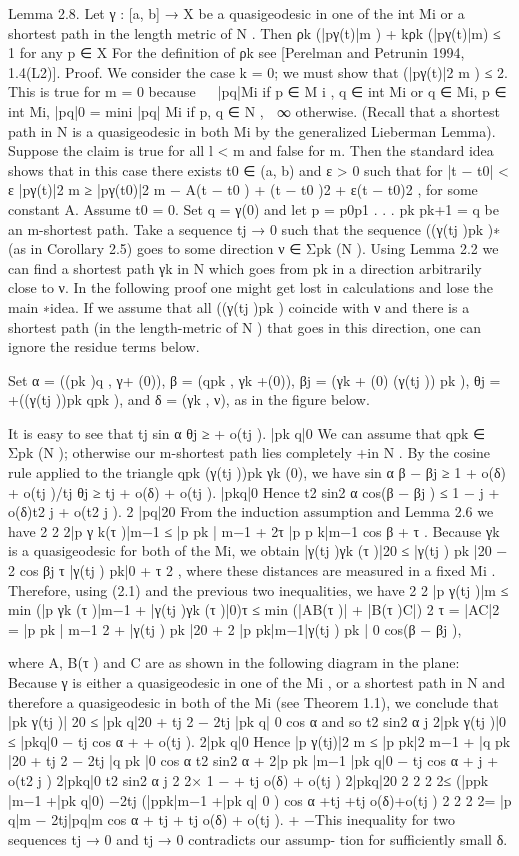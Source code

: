 Lemma 2.8. Let γ : [a, b] → X be a quasigeodesic in one of the int Mi or a
shortest path in the length metric of N . Then
ρk (|pγ(t)|m ) + kρk (|pγ(t)|m) ≤ 1
for any p ∈ X
For the definition of ρk see [Perelman and Petrunin 1994, 1.4(L2)].
Proof. We consider the case k = 0; we must show that (|pγ(t)|2 m ) ≤ 2.
This is true for m = 0 because

 |pq|Mi
 if p ∈ M i , q ∈ int Mi or q ∈ Mi, p ∈ int Mi,
|pq|0 = mini |pq| Mi if p, q ∈ N ,

∞
 otherwise.
(Recall that a shortest path in N is a quasigeodesic in both Mi by the generalized
Lieberman Lemma).
Suppose the claim is true for all l < m and false for m. Then the standard
idea shows that in this case there exists t0 ∈ (a, b) and ε > 0 such that for
|t − t0| < ε
|pγ(t)|2 m ≥ |pγ(t0)|2 m − A(t − t0 ) + (t − t0 )2 + ε(t − t0)2 ,
for some constant A.
Assume t0 = 0. Set q = γ(0) and let p = p0p1 . . . pk pk+1 = q be an m-shortest
path. Take a sequence tj → 0 such that the sequence ((γ(tj )pk )∗ (as in Corollary
2.5) goes to some direction ν ∈ Σpk (N ). Using Lemma 2.2 we can find a shortest
path γk in N which goes from pk in a direction arbitrarily close to ν.
In the following proof one might get lost in calculations and lose the main
∗idea. If we assume that all ((γ(tj )pk ) coincide with ν and there is a shortest
path (in the length-metric of N ) that goes in this direction, one can ignore the
residue terms below.

Set α = ((pk )q , γ+ (0)), β = (qpk , γk +(0)), βj = (γk + (0) (γ(tj )) pk ), θj =
+((γ(tj ))pk qpk ), and δ = (γk , ν), as in the figure below.

It is easy to see that
tj sin α
θj ≥
 + o(tj ).
|pk q|0
We can assume that qpk ∈ Σpk (N ); otherwise our m-shortest path lies completely
+in N . By the cosine rule applied to the triangle qpk (γ(tj ))pk γk (0), we have
sin α
β − βj ≥ 1 + o(δ) + o(tj )/tj θj ≥ tj
 + o(δ)
 + o(tj ).
|pkq|0
Hence
t2 sin2 α
cos(β − βj ) ≤ 1 −
 j + o(δ)t2 j + o(t2 j ).
2 |pq|20
From the induction assumption and Lemma 2.6 we have
2 2 2|p γ k(τ )|m−1 ≤ |p pk | m−1 + 2τ |p p k|m−1 cos β + τ .
Because γk is a quasigeodesic for both of the Mi, we obtain
|γ(tj )γk (τ )|20 ≤ |γ(tj ) pk |20 − 2 cos βj τ |γ(tj ) pk|0 + τ 2 ,
where these distances are measured in a fixed Mi .
Therefore, using (2.1) and the previous two inequalities, we have
2 2
|p γ(tj )|m ≤ min (|p γk (τ )|m−1 + |γ(tj )γk (τ )|0)τ
≤ min (|AB(τ )| + |B(τ )C|) 2
τ
= |AC|2 = |p pk | m−1 2 + |γ(tj ) pk |20 + 2 |p pk|m−1|γ(tj ) pk | 0 cos(β − βj ),

where A, B(τ ) and C are as shown in the following diagram in the plane:
Because γ is either a quasigeodesic in one of the Mi , or a shortest path in N
and therefore a quasigeodesic in both of the Mi (see Theorem 1.1), we conclude
that
|pk γ(tj )| 20 ≤ |pk q|20 + tj 2 − 2tj |pk q| 0 cos α
and so
t2 sin2 α
j 2|pk γ(tj )|0 ≤ |pkq|0 − tj cos α +
 + o(tj ).
2|pk q|0
Hence
|p γ(tj)|2 m ≤ |p pk|2 m−1 + |q pk |20 + tj 2 − 2tj |q pk |0 cos α
t2 sin2 α
+ 2|p pk |m−1 |pk q|0 − tj cos α +
 j + o(t2 j )
2|pkq|0
t2 sin2 α
j 2 2×
 1 −
 + tj o(δ) + o(tj )
2|pkq|20
2 2 2 2≤ (|ppk |m−1 +|pk q|0) −2tj (|ppk|m−1 +|pk q| 0 ) cos α +tj +tj o(δ)+o(tj )
2 2 2 2= |p q|m − 2tj|pq|m cos α + tj + tj o(δ) + o(tj ).
+ −This inequality for two sequences tj → 0 and tj → 0 contradicts our assump-
tion for sufficiently small δ.


